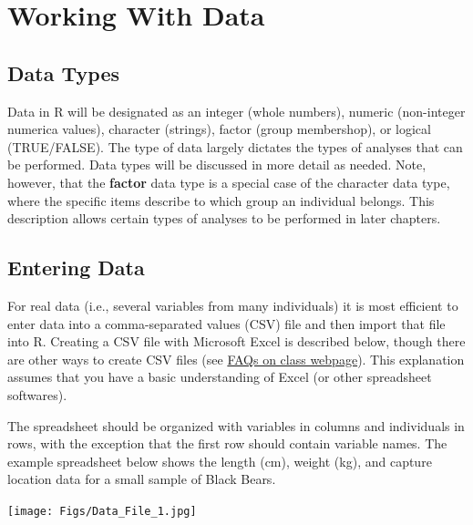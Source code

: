 \documentclass[10pt,openany]{book}\usepackage[]{graphicx}\usepackage[]{color}
\begin{document}
\section{Working With Data}
\subsection{Data Types}  \label{sect:RDataTypes}
Data in R will be designated as an integer (whole numbers), numeric (non-integer numerica values), character (strings), factor (group membershop), or logical (TRUE/FALSE).  The type of data largely dictates the types of analyses that can be performed.  Data types will be discussed in more detail as needed.  Note, however, that the \textbf{factor} data type is a special case of the character data type, where the specific items describe to which group an individual belongs.  This description allows certain types of analyses to be performed in later chapters.


\subsection{Entering Data}  \label{sect:REnterData}
For real data (i.e., several variables from many individuals) it is most efficient to enter data into a comma-separated values (CSV) file and then import that file into R.  Creating a CSV file with Microsoft Excel is described below, though there are other ways to create CSV files (see \href{http://derekogle.com/NCMTH107/resources/FAQ/}{FAQs on class webpage}).  This explanation assumes that you have a basic understanding of Excel (or other spreadsheet softwares).


The spreadsheet should be organized with variables in columns and individuals in rows, with the exception that the first row should contain variable names.  The example spreadsheet below shows the length (cm), weight (kg), and capture location data for a small sample of Black Bears.

\begin{center}
  \texttt{[image: Figs/Data\_File\_1.jpg]}
\end{center}


\end{document}
